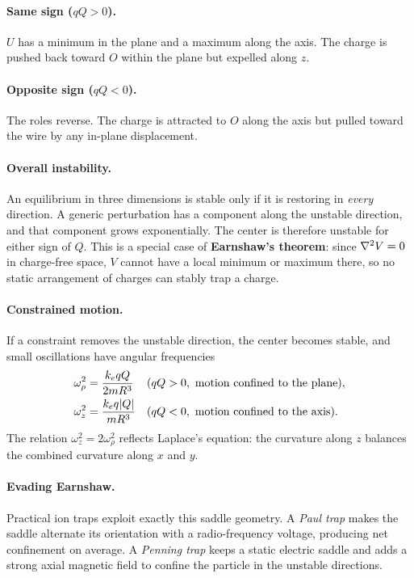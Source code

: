 \documentclass[11pt,a4paper]{article}
\newcommand{\ke}{k_e}
\begin{document}
\paragraph{Same sign ($qQ>0$).} $U$ has a minimum in the plane and a maximum along the axis. The charge is pushed back toward $O$ within the plane but expelled along $z$.

\paragraph{Opposite sign ($qQ<0$).} The roles reverse. The charge is attracted to $O$ along the axis but pulled toward the wire by any in-plane displacement.

\paragraph{Overall instability.} An equilibrium in three dimensions is stable only if it is restoring in \emph{every} direction. A generic perturbation has a component along the unstable direction, and that component grows exponentially. The center is therefore unstable for either sign of $Q$. This is a special case of \textbf{Earnshaw's theorem}: since $\laplacian V=0$ in charge-free space, $V$ cannot have a local minimum or maximum there, so no static arrangement of charges can stably trap a charge.

\paragraph{Constrained motion.} If a constraint removes the unstable direction, the center becomes stable, and small oscillations have angular frequencies
\begin{align}
\omega_\rho^2&=\frac{\ke qQ}{2mR^3} &&(qQ>0,\ \text{motion confined to the plane}),\\
\omega_z^2&=\frac{\ke q\abs{Q}}{mR^3} &&(qQ<0,\ \text{motion confined to the axis}).
\end{align}
The relation $\omega_z^2=2\omega_\rho^2$ reflects Laplace's equation: the curvature along $z$ balances the combined curvature along $x$ and $y$.

\paragraph{Evading Earnshaw.} Practical ion traps exploit exactly this saddle geometry. A \emph{Paul trap} makes the saddle alternate its orientation with a radio-frequency voltage, producing net confinement on average. A \emph{Penning trap} keeps a static electric saddle and adds a strong axial magnetic field to confine the particle in the unstable directions.
\end{document}
